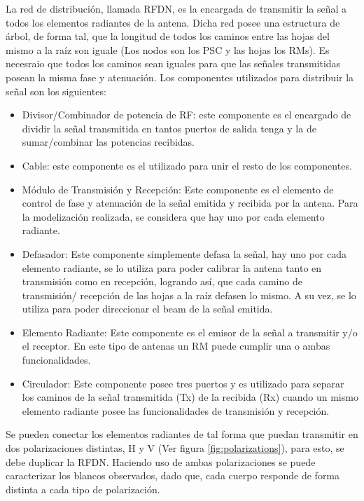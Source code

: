 La red de distribución, llamada RFDN, es la encargada de transmitir la señal a todos los elementos radiantes de la antena.
Dicha red posee una estructura de árbol, de forma tal, que la longitud de todos los caminos entre las hojas del mismo a
la raíz son iguale (Los nodos son los PSC y las hojas los RMs). Es necesraio que todos los caminos sean iguales para que las
señales transmitidas posean la misma fase y atenuación. Los componentes utilizados para distribuir la señal son los siguientes:

\begin{itemize}
	\item Divisor/Combinador de potencia de RF: este componente es el encargado de dividir la señal transmitida en tantos puertos 
		de salida tenga y la de sumar/combinar las potencias recibidas.
	\item Cable: este componente es el utilizado para unir el resto de los componentes.
	\item Módulo de Transmisión y Recepción: Este componente es el elemento de control de fase y atenuación de la señal emitida y
		recibida por la antena. Para la modelización realizada, se considera que hay uno por cada elemento radiante.
	\item Defasador: Este componente simplemente defasa la señal, hay uno por cada elemento radiante, se lo utiliza
		para poder calibrar la antena tanto en transmisión como en recepción, logrando así, que cada camino de transmisión/
		recepción de las hojas a la raíz defasen lo mismo. A su vez, se lo utiliza para poder direccionar el beam de la señal
		emitida.
	\item Elemento Radiante: Este componente es el emisor de la señal a transmitir y/o el receptor. En este tipo de antenas un
		RM puede cumplir una o ambas funcionalidades.
	\item Circulador: Este componente posee tres puertos y es utilizado para separar los caminos de la señal transmitida (Tx) de 
		la recibida (Rx) cuando un mismo elemento radiante posee las funcionalidades de transmisión y recepción. 
\end{itemize}

Se pueden conectar los elementos radiantes de tal forma que puedan transmitir en dos polarizaciones distintas, H y V (Ver figura
\ref{fig:polarizations}), para esto, se debe duplicar la RFDN. Haciendo uso de ambas polarizaciones se puede caracterizar
los blancos observados, dado que, cada cuerpo responde de forma distinta a cada tipo de polarización.

